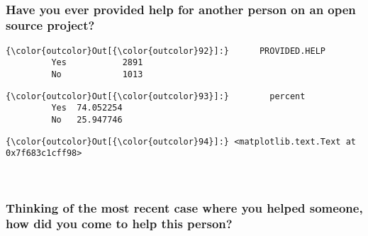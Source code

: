 \documentclass[11pt]{article}
\begin{document}
    \begin{center}
    \end{center}
    { \hspace*{\fill} \\}
    
    \subsubsection{Have you ever provided help for another person on an open
source
project?}\label{have-you-ever-provided-help-for-another-person-on-an-open-source-project}


            \begin{Verbatim}[commandchars=\\\{\}]
{\color{outcolor}Out[{\color{outcolor}92}]:}      PROVIDED.HELP
         Yes           2891
         No            1013
\end{Verbatim}
        

            \begin{Verbatim}[commandchars=\\\{\}]
{\color{outcolor}Out[{\color{outcolor}93}]:}        percent
         Yes  74.052254
         No   25.947746
\end{Verbatim}
        

            \begin{Verbatim}[commandchars=\\\{\}]
{\color{outcolor}Out[{\color{outcolor}94}]:} <matplotlib.text.Text at 0x7f683c1cff98>
\end{Verbatim}
        
    \begin{center}
    \end{center}
    { \hspace*{\fill} \\}
    

    \subsubsection{Thinking of the most recent case where you helped
someone, how did you come to help this
person?}\label{thinking-of-the-most-recent-case-where-you-helped-someone-how-did-you-come-to-help-this-person}
\end{document}
